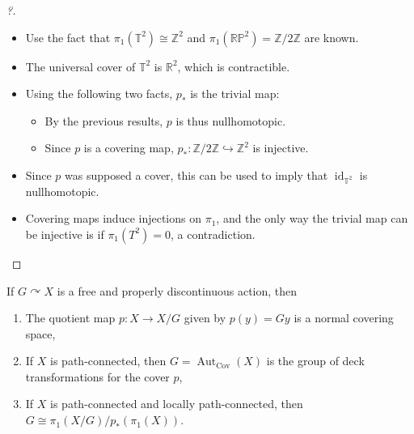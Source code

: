 \begin{proof}[?]

\envlist

\begin{itemize}
\tightlist
\item
  Use the fact that \(\pi_1({\mathbb{T}}^2) \cong {\mathbb{Z}}^2\) and
  \(\pi_1({\mathbb{RP}}^2) = {\mathbb{Z}}/2{\mathbb{Z}}\) are known.
\item
  The universal cover of \({\mathbb{T}}^2\) is \({\mathbb{R}}^2\), which
  is contractible.
\item
  Using the following two facts, \(p_*\) is the trivial map:

  \begin{itemize}
  \tightlist
  \item
    By the previous results, \(p\) is thus nullhomotopic.
  \item
    Since \(p\) is a covering map,
    \(p_*: {\mathbb{Z}}/2{\mathbb{Z}}\hookrightarrow{\mathbb{Z}}^2\) is
    injective.
  \end{itemize}
\item
  Since \(p\) was supposed a cover, this can be used to imply that
  \(\operatorname{id}_{{\mathbb{T}}^2}\) is nullhomotopic.
\item
  Covering maps induce injections on \(\pi_1\), and the only way the
  trivial map can be injective is if \(\pi_1(T^2) = 0\), a
  contradiction.
\end{itemize}

\end{proof}

\begin{theorem}

If \(G\curvearrowright X\) is a free and properly discontinuous action,
then

\begin{enumerate}
\def\labelenumi{\arabic{enumi}.}
\item
  The quotient map \(p:X \to X/G\) given by \(p(y) = Gy\) is a normal
  covering space,
\item
  If \(X\) is path-connected, then
  \(G = {\operatorname{Aut}}_{\mathrm{Cov}} (X)\) is the group of deck
  transformations for the cover \(p\),
\item
  If \(X\) is path-connected and locally path-connected, then
  \(G\cong \pi_1(X/G) / p_*(\pi_1(X))\).
\end{enumerate}

\end{theorem}

